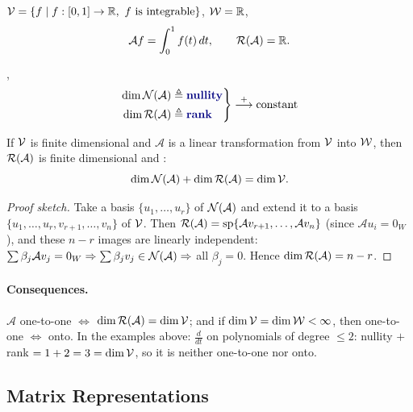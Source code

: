 \begin{example}
$\mathcal{V}=\{f\mid f:[0,1]\to\mathbb{R},\ f \text{ is integrable}\}$, \quad $\mathcal{W}=\mathbb{R}$,
\[
\mathcal{A}f=\int_0^1 f(t)\,dt, \qquad \mathcal{R}(\mathcal{A})=\mathbb{R}.
\]
\end{example}

\sep
\[
\left.\begin{aligned}
\dim\Null(\mathcal{A}) &\triangleq \text{\term{nullity}}\\
\dim\Range(\mathcal{A}) &\triangleq \text{\term{rank}}
\end{aligned}\right\}\overset{+}{\longrightarrow} \text{constant}
\]

\begin{theorem}
If $\mathcal{V}$ is finite dimensional and $\mathcal{A}$ is a linear transformation from $\mathcal{V}$ into $\mathcal{W}$, then $\mathcal{R}(\mathcal{A})$ is finite dimensional and :
\[
\dim\mathcal{N}(\mathcal{A})+\dim\mathcal{R}(\mathcal{A})=\dim\mathcal{V} .
\]
\end{theorem}
\begin{insight}
\begin{proof}[Proof sketch]
Take a basis $\{u_1,\dots,u_r\}$ of $\mathcal{N}(\mathcal{A})$ and extend it to a basis $\{u_1,\dots,u_r,v_{r+1},\dots,v_n\}$ of $\mathcal{V}$. Then $\mathcal{R}(\mathcal{A})=\operatorname{sp}\{\mathcal{A}v_{r+1},\dots,\mathcal{A}v_n\}$ (since $\mathcal{A}u_i=0_W$), and these $n-r$ images are linearly independent: $\sum\beta_j\mathcal{A}v_j=0_W\Rightarrow\sum\beta_jv_j\in\mathcal{N}(\mathcal{A})\Rightarrow$ all $\beta_j=0$. Hence $\dim\mathcal{R}(\mathcal{A})=n-r$.
\end{proof}
\paragraph{Consequences.} $\mathcal{A}$ one-to-one $\iff$ $\dim\mathcal{R}(\mathcal{A})=\dim\mathcal{V}$; and if $\dim\mathcal{V}=\dim\mathcal{W}<\infty$, then one-to-one $\iff$ onto. In the examples above: $\frac{d}{dt}$ on polynomials of degree $\le2$: nullity $+$ rank $=1+2=3=\dim\mathcal{V}$, so it is neither one-to-one nor onto.
\end{insight}

\subsection{Matrix Representations}\label{ss:matrix-rep}

